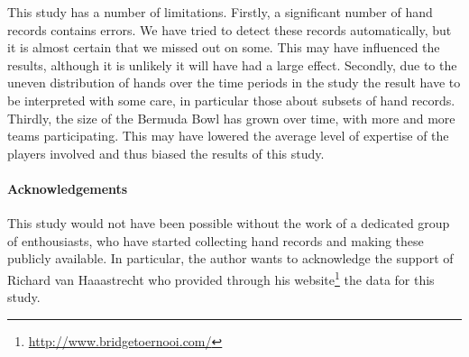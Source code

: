 \documentclass{llncs}
\begin{document}
This study has a number of limitations. Firstly, a significant number
of hand records contains errors. We have tried to detect these records
automatically, but it is almost certain that we missed out on some.
This may have influenced the results, although it is unlikely it will
have had a large effect. Secondly, due to the uneven distribution of
hands over the time periods in the study the result have to be
interpreted with some care, in particular those about subsets of hand
records. Thirdly, the size of the Bermuda Bowl has grown over time,
with more and more teams participating. This may have lowered the
average level of expertise of the players involved and thus biased the
results of this study.


\paragraph{Acknowledgements}

This study would not have been possible without the work of a
dedicated group of enthousiasts, who have started collecting hand
records and making these publicly available. In particular, the author
wants to acknowledge the support of Richard van Haaastrecht who
provided through his website\footnote{%
\url{http://www.bridgetoernooi.com/}} the data for this study.



\end{document}

